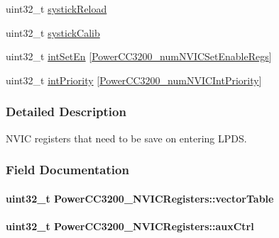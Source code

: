 \begin{DoxyCompactItemize}
\item 
uint32\+\_\+t \hyperlink{struct_power_c_c3200___n_v_i_c_registers_a6b61732d4517b488b2b65689ddd53406}{systick\+Reload}
\item 
uint32\+\_\+t \hyperlink{struct_power_c_c3200___n_v_i_c_registers_a92ef14f85fd6d8c1a2ca1838aca7d33c}{systick\+Calib}
\item 
uint32\+\_\+t \hyperlink{struct_power_c_c3200___n_v_i_c_registers_a8b1f7269c5d56f88a03b34431e2982d6}{int\+Set\+En} \mbox{[}\hyperlink{_power_c_c3200_8h_ae8be40b57cc2977d11d8e433905626b0}{Power\+C\+C3200\+\_\+num\+N\+V\+I\+C\+Set\+Enable\+Regs}\mbox{]}
\item 
uint32\+\_\+t \hyperlink{struct_power_c_c3200___n_v_i_c_registers_aa01c82b18988c8453821515fab04412a}{int\+Priority} \mbox{[}\hyperlink{_power_c_c3200_8h_aa9308e92f793082775a42d2dc7f62098}{Power\+C\+C3200\+\_\+num\+N\+V\+I\+C\+Int\+Priority}\mbox{]}
\end{DoxyCompactItemize}


\subsubsection{Detailed Description}
N\+V\+I\+C registers that need to be save on entering L\+P\+D\+S. 

\subsubsection{Field Documentation}
\paragraph[{vector\+Table}]{\setlength{\rightskip}{0pt plus 5cm}uint32\+\_\+t Power\+C\+C3200\+\_\+\+N\+V\+I\+C\+Registers\+::vector\+Table}\label{struct_power_c_c3200___n_v_i_c_registers_a74fc1ecc344c0abca6ec895aae4950c2}
\paragraph[{aux\+Ctrl}]{\setlength{\rightskip}{0pt plus 5cm}uint32\+\_\+t Power\+C\+C3200\+\_\+\+N\+V\+I\+C\+Registers\+::aux\+Ctrl}\label{struct_power_c_c3200___n_v_i_c_registers_ae496eff43873c94c5848b60affc4053c}

